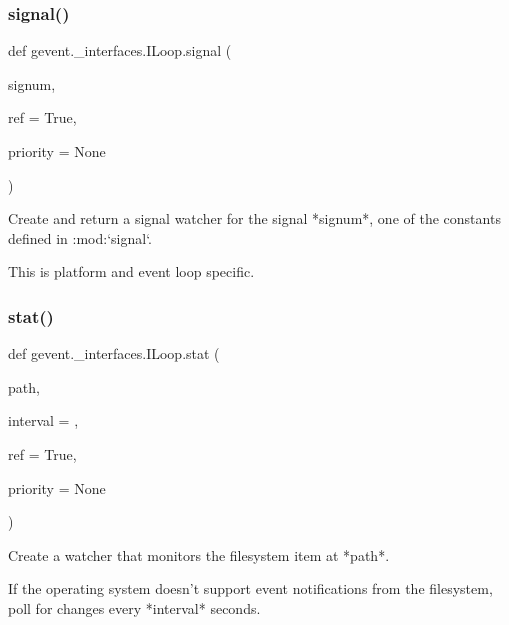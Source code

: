 \subsubsection{\texorpdfstring{signal()}{signal()}}
{\footnotesize\ttfamily def gevent.\+\_\+interfaces.\+I\+Loop.\+signal (\begin{DoxyParamCaption}\item[{}]{signum,  }\item[{}]{ref = {\ttfamily True},  }\item[{}]{priority = {\ttfamily None} }\end{DoxyParamCaption})}

\begin{DoxyVerb}Create and return a signal watcher for the signal *signum*,
one of the constants defined in :mod:`signal`.

This is platform and event loop specific.
\end{DoxyVerb}
 \mbox{\label{classgevent_1_1__interfaces_1_1_i_loop_a8906af9ad6b57cb89d18a376221031e6}} 
\subsubsection{\texorpdfstring{stat()}{stat()}}
{\footnotesize\ttfamily def gevent.\+\_\+interfaces.\+I\+Loop.\+stat (\begin{DoxyParamCaption}\item[{}]{path,  }\item[{}]{interval = {},  }\item[{}]{ref = {\ttfamily True},  }\item[{}]{priority = {\ttfamily None} }\end{DoxyParamCaption})}

\begin{DoxyVerb}Create a watcher that monitors the filesystem item at *path*.

If the operating system doesn't support event notifications
from the filesystem, poll for changes every *interval* seconds.
\end{DoxyVerb}
 \mbox{\label{classgevent_1_1__interfaces_1_1_i_loop_a7d6251104dbf1e3181696df8265a0fd3}} 
